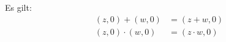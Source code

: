 Es gilt: \begin{align*}
    (z, 0) + (w, 0) &= (z+w, 0) \\
    (z, 0) \cdot (w, 0) &= (z \cdot w, 0)
\end{align*}